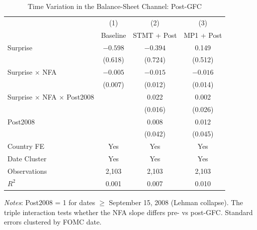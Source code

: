 \documentclass[12pt]{article}
\begin{document}
\begin{table}
\centering
\caption{Time Variation in the Balance-Sheet Channel: Post-GFC}
\label{tab:time_variation}
\begin{tabular}{lccc}
\toprule
 & (1) & (2) & (3) \\
 & Baseline & STMT + Post & MP1 + Post \\
\midrule
Surprise & $-0.598$ & $-0.394$ & 0.149 \\
 & (0.618) & (0.724) & (0.512) \\
Surprise $\times$ NFA & $-0.005$ & $-0.015$ & $-0.016$ \\
 & (0.007) & (0.012) & (0.014) \\
Surprise $\times$ NFA $\times$ Post2008 & & 0.022 & 0.002 \\
 & & (0.016) & (0.026) \\
Post2008 & & 0.008 & 0.012 \\
 & & (0.042) & (0.045) \\
\midrule
Country FE & Yes & Yes & Yes \\
Date Cluster & Yes & Yes & Yes \\
Observations & 2,103 & 2,103 & 2,103 \\
$R^2$ & 0.001 & 0.007 & 0.010 \\
\bottomrule
\end{tabular}
\begin{flushleft}
\footnotesize \textit{Notes}: Post2008 = 1 for dates $\geq$ September 15, 2008 (Lehman collapse). The triple interaction tests whether the NFA slope differs pre- vs post-GFC. Standard errors clustered by FOMC date.
\end{flushleft}
\end{table}
\end{document}

